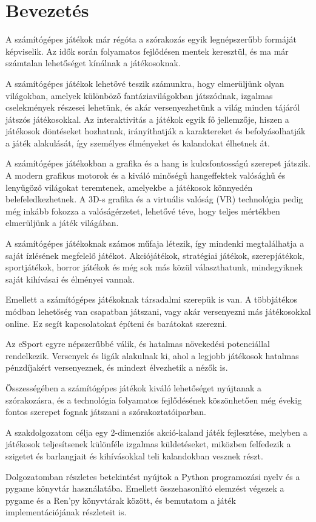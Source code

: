 \chapter{Bevezetés}

A számítógépes játékok már régóta a szórakozás egyik legnépszerűbb formáját képviselik. Az idők során folyamatos fejlődésen mentek keresztül, és ma már számtalan lehetőséget kínálnak a játékosoknak.

A számítógépes játékok lehetővé teszik számunkra, hogy elmerüljünk olyan világokban, amelyek különböző fantáziavilágokban játszódnak, izgalmas cselekmények részesei lehetünk, és akár versenyezhetünk a világ minden tájáról játszós játékosokkal. Az interaktivitás a játékok egyik fő jellemzője, hiszen a játékosok döntéseket hozhatnak, irányíthatják a karaktereket és befolyásolhatják a játék alakulását, így személyes élményeket és kalandokat élhetnek át.

A számítógépes játékokban a grafika és a hang is kulcsfontosságú szerepet játszik. A modern grafikus motorok és a kiváló minőségű hangeffektek valósághű és lenyűgöző világokat teremtenek, amelyekbe a játékosok könnyedén belefeledkezhetnek. A 3D-s grafika és a virtuális valóság (VR) technológia pedig még inkább fokozza a valóságérzetet, lehetővé téve, hogy teljes mértékben elmerüljünk a játék világában.

A számítógépes játékoknak számos műfaja létezik, így mindenki megtalálhatja a saját ízlésének megfelelő játékot. Akciójátékok, stratégiai játékok, szerepjátékok, sportjátékok, horror játékok és még sok más közül választhatunk, mindegyiknek saját kihívásai és élményei vannak.

Emellett a számítógépes játékoknak társadalmi szerepük is van. A többjátékos módban lehetőség van csapatban játszani, vagy akár versenyezni más játékosokkal online. Ez segít kapcsolatokat építeni és barátokat szerezni.

Az eSport egyre népszerűbbé válik, és hatalmas növekedési potenciállal rendelkezik. Versenyek és ligák alakulnak ki, ahol a legjobb játékosok hatalmas pénzdíjakért versenyeznek, és mindezt élvezhetik a nézők is.

Összességében a számítógépes játékok kiváló lehetőséget nyújtanak a szórakozásra, és a technológia folyamatos fejlődésének köszönhetően még évekig fontos szerepet fognak játszani a szórakoztatóiparban.

A szakdolgozatom célja egy 2-dimenziós akció-kaland játék fejlesztése, melyben a játékosok teljesítsenek különféle izgalmas küldetéseket, miközben felfedezik a szigetet és barlangjait és kihívásokkal teli kalandokban vesznek részt.

Dolgozatomban részletes betekintést nyújtok a Python programozási nyelv és a pygame könyvtár használatába. Emellett összehasonlító elemzést végezek a pygame és a Ren'py könyvtárak között, és bemutatom a játék implementációjának részleteit is.
